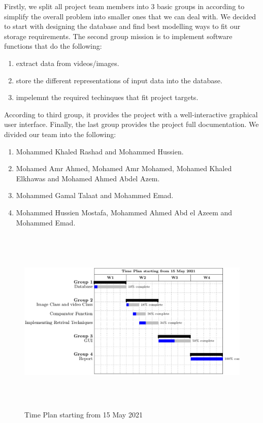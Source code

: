 Firstly, we split all project team members into 3 basic groups in according to simplify the overall problem into 
smaller ones that we can deal with.
We decided to start with designing the database and find best modelling ways to fit our storage requirements.
The second group mission is to implement software functions that do the following:
\vskip 0.2in
\begin{enumerate}
    \item extract data from videos/images.
    \item store the different representations of input data into the database.
    \item impelemnt the required techinques that fit project targets.
\end{enumerate}
According to third group, it provides the project with a well-interactive graphical user interface.
Finally, the last group provides the project full documentation.
\vskip 0.2in
We divided our team into the following:
\begin{enumerate}
    \item Mohammed Khaled Rashad and Mohammed Hussien.
    \item Mohamed Amr Ahmed, Mohamed Amr Mohamed, Mohamed Khaled \vskip 0.05in
     Elkhawas and Mohamed Ahmed Abdel Azem.
    \item Mohammed Gamal Talaat and Mohammed Emad.
    \item Mohammed Hussien Mostafa, Mohammed Ahmed Abd el Azeem and Mohammed Emad.
\end{enumerate}


\begin{figure}[H]
  \centering
  \includegraphics[width=120mm,height=90mm]{Images/time_plan.png}
  \caption{Time Plan starting from 15 May 2021}
\end{figure}
\vskip 0.2in